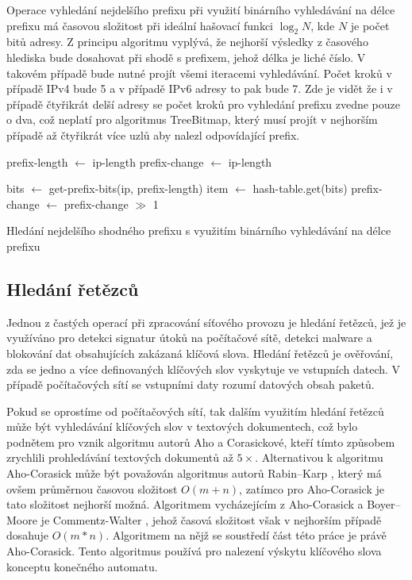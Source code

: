 Operace vyhledání nejdelšího prefixu při využití binárního vyhledávání na délce prefixu má časovou
složitost při ideální hašovací funkci $\log_2{N}$, kde $N$ je počet bitů adresy. Z principu algoritmu vyplývá, že nejhorší výsledky z časového hlediska bude dosahovat
při shodě s prefixem, jehož délka je liché číslo. V takovém případě bude nutné projít všemi iteracemi vyhledávání.
Počet kroků v případě IPv4 bude 5 a v případě IPv6 adresy to pak bude 7.
Zde je vidět že i v případě čtyřikrát delší adresy se počet kroků pro vyhledání prefixu zvedne pouze o dva,
což neplatí pro algoritmus TreeBitmap, který musí projít v nejhorším případě až čtyřikrát více
uzlů aby nalezl odpovídající prefix.

\begin{algorithm}
	prefix-length $\leftarrow$ ip-length\;
	prefix-change $\leftarrow$ ip-length\;
	{
		bits $\leftarrow$ get-prefix-bits(ip, prefix-length)\;
		item $\leftarrow$ hash-table.get(bits)\;
		prefix-change $\leftarrow$ prefix-change $\gg$ 1\;

	}
    \caption{Hledání nejdelšího shodného prefixu s využitím binárního vyhledávání na délce prefixu}
    \label{alg:bspl}
\end{algorithm}

\subsection{Hledání řetězců} %

Jednou z častých operací při zpracování síťového provozu je hledání řetězců, jež je využíváno pro detekci
signatur útoků na počítačové sítě, detekci malware a blokování dat obsahujících zakázaná klíčová slova.
Hledání řetězců je ověřování, zda se jedno a více definovaných klíčových slov vyskytuje ve vstupních
datech. V případě počítačových sítí se vstupními daty rozumí datových obsah paketů.

Pokud se oprostíme od počítačových sítí, tak dalším využitím hledání řetězců může být
vyhledávání klíčových slov v textových dokumentech, což bylo podnětem pro vznik
algoritmu autorů Aho a Corasickové, kteří tímto způsobem zrychlili prohledávání
textových dokumentů až $5\times$. Alternativou k algoritmu Aho-Corasick může být považován
algoritmus autorů Rabin–Karp \cite{rabin-karp}, který má ovšem průměrnou časovou složitost $O(m+n)$,
zatímco pro Aho-Corasick je tato složitost nejhorší možná. Algoritmem vycházejícím z Aho-Corasick
a Boyer–Moore \cite{boyer-moore}
je Commentz-Walter \cite{walter}, jehož časová složitost však v nejhorším případě dosahuje $O(m*n)$.
Algoritmem na nějž se soustředí část této práce je právě Aho-Corasick.
Tento algoritmus používá pro nalezení výskytu klíčového slova konceptu konečného automatu.

